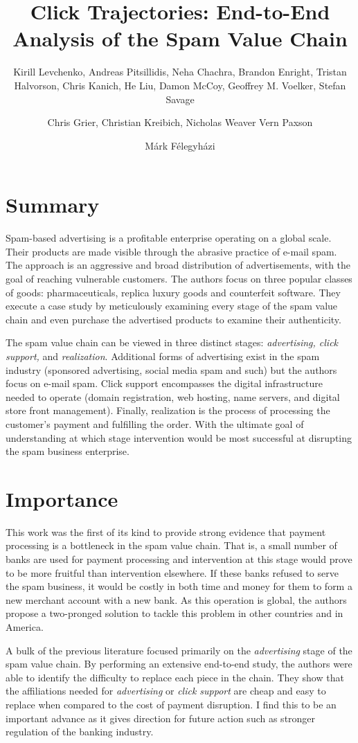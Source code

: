 \documentclass[fleqn,11pt]{wlpeerj} %
\title{Click Trajectories: End-to-End Analysis of the Spam Value Chain}
\author[]{Kirill Levchenko, Andreas Pitsillidis, Neha Chachra, Brandon Enright, Tristan Halvorson, Chris Kanich, He Liu, Damon McCoy, Geoffrey M. Voelker, Stefan Savage}
\affil[]{Department of Computer Science and Engineering \newline \null\hspace{0.1em} University of California, San Diego}
\author[]{Chris Grier, Christian Kreibich, Nicholas Weaver Vern Paxson}
\affil[]{Computer Science Division \newline \null\hspace{0.1em} University of California, Berkely}
\author[]{Márk Félegyházi}
\affil[]{Laboratory of Cryptography and System Security (CrySyS) \newline \null\hspace{0.1em} Budapest University of Technology and Economics}
\begin{document}
\flushbottom
\maketitle
\thispagestyle{empty}

\section*{Summary}

Spam-based advertising is a profitable enterprise operating on a global scale. Their products are made visible through the abrasive practice of e-mail spam. The approach is an aggressive and broad distribution of advertisements, with the goal of reaching vulnerable customers. The authors focus on three popular classes of goods: pharmaceuticals, replica luxury goods and counterfeit software. They execute a case study by meticulously examining every stage of the spam value chain and even purchase the advertised products to examine their authenticity.

The spam value chain can be viewed in three distinct stages: \textit{advertising, click support,} and \textit{realization}. Additional forms of advertising exist in the spam industry (sponsored advertising, social media spam and such) but the authors focus on e-mail spam. Click support encompasses the digital infrastructure needed to operate (domain registration, web hosting, name servers, and digital store front management). Finally, realization is the process of processing the customer's payment and fulfilling the order. With the ultimate goal of understanding at which stage intervention would be most successful at disrupting the spam business enterprise.

\section*{Importance}

This work was the first of its kind to provide strong evidence that payment processing is a bottleneck in the spam value chain. That is, a small number of banks are used for payment processing and intervention at this stage would prove to be more fruitful than intervention elsewhere. If these banks refused to serve the spam business, it would be costly in both time and money for them to form a new merchant account with a new bank. As this operation is global, the authors propose a two-pronged solution to tackle this problem in other countries and in America.

A bulk of the previous literature focused primarily on the \textit{advertising} stage of the spam value chain. By performing an extensive end-to-end study, the authors were able to identify the difficulty to replace each piece in the chain. They show that the affiliations needed for \textit{advertising} or \textit{click support} are cheap and easy to replace when compared to the cost of payment disruption. I find this to be an important advance as it gives direction for future action such as stronger regulation of the banking industry.
\end{document}
